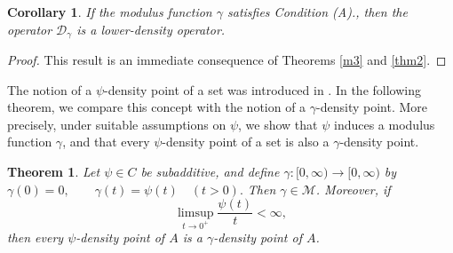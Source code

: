 \documentclass{amsart}
\newtheorem{theorem}{Theorem}
\theoremstyle{plain}
\newtheorem{corollary}{Corollary}
\numberwithin{equation}{section}
\begin{document}
\begin{corollary}\label{cor1.15}
    If the modulus function $\gamma$ satisfies Condition (A)., then the operator $\mathcal{D}_\gamma$ is a lower-density operator.
\end{corollary}
\begin{proof}
    This result is an immediate consequence of Theorems \ref{m3} and \ref{thm2}. 
\end{proof}
The notion of a $\psi$-density point of a set was introduced in \cite{mepsi}. In the following theorem, we compare this concept with the notion of a $\gamma$-density point. More precisely, under suitable assumptions on $\psi$, we show that $\psi$ induces a modulus function $\gamma$, and that every $\psi$-density point of a set is also a $\gamma$-density point.
\begin{theorem}\label{thm15}
Let $\psi \in C$ be subadditive, and define $\gamma:[0,\infty)\to[0,\infty)$ by
$ \gamma(0)=0,\qquad \gamma(t)=\psi(t)\quad (t>0). $
Then $\gamma \in \mathcal{M}$.
Moreover, if
$$ \limsup_{t\to 0^+}\frac{\psi(t)}{t}<\infty, $$
then every $\psi$-density point of $A$ is a $\gamma$-density point of $A$.
\end{theorem}
\end{document}
